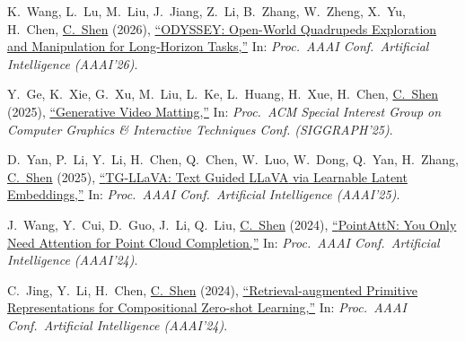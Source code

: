 \documentclass[9pt, a4paper]{article}
\newcommand{\years}[1]{\marginnote{\scriptsize #1}}
\def\highlight{\uline}
\begin{document}
\years{2026} \noindent K.~Wang, L.~Lu, M.~Liu, J.~Jiang, Z.~Li, B.~Zhang, W.~Zheng, X.~Yu, H.~Chen, \highlight{C.~Shen} (2026),
\href{http://www.google.com/search?lr=&ie=UTF-8&oe=UTF-8&q=ODYSSEY%3A+Open-World+Quadrupeds+Exploration+and+Manipulation+for+Long-Horizon+Tasks+Kaijun+Wang%2C+Liqin+Lu%2C+Mingyu+Liu%2C+Jianuo+Jiang%2C+Zeju+Li%2C+Bolin+Zhang%2C+Wancai+Zheng%2C+Xinyi+Yu%2C+Hao+Chen%2C+Chunhua+Shen}{``{ODYSSEY}: Open-World Quadrupeds Exploration and Manipulation for Long-Horizon Tasks,{}''}
In: \emph{Proc.\ AAAI Conf.\  Artificial Intelligence (AAAI'26)}.

\medskip

\years{2025} Y.~Ge, K.~Xie, G.~Xu, M.~Liu, L.~Ke, L.~Huang, H.~Xue, H.~Chen, \highlight{C.~Shen} (2025),
\href{http://www.google.com/search?lr=&ie=UTF-8&oe=UTF-8&q=Generative+Video+Matting+Yongtao+Ge%2C+Kangyang+Xie%2C+Guangkai+Xu%2C+Mingyu+Liu%2C+Li+Ke%2C+Longtao+Huang%2C+Hui+Xue%2C+Hao+Chen%2C+Chunhua+Shen}{``Generative Video Matting,{}''}
In: \emph{Proc.\ ACM Special Interest Group on Computer Graphics \& Interactive Techniques Conf. (SIGGRAPH'25)}.

\medskip

\years{2025} D.~Yan, P.~Li, Y.~Li, H.~Chen, Q.~Chen, W.~Luo, W.~Dong, Q.~Yan, H.~Zhang, \highlight{C.~Shen} (2025),
\href{http://www.google.com/search?lr=&ie=UTF-8&oe=UTF-8&q=TG-LLaVA%3A+Text+Guided+LLaVA+via+Learnable+Latent+Embeddings+Dawei+Yan%2C+Pengcheng+Li%2C+Yang+Li%2C+Hao+Chen%2C+Qingguo+Chen%2C+Weihua+Luo%2C+Wei+Dong%2C+Qingsen+Yan%2C+Haokui+Zhang%2C+Chunhua+Shen}{``{TG-LLaVA}: Text Guided {LLaVA} via Learnable Latent Embeddings,{}''}
In: \emph{Proc.\ AAAI Conf.\  Artificial Intelligence (AAAI'25)}.

\medskip

\years{2024} J.~Wang, Y.~Cui, D.~Guo, J.~Li, Q.~Liu, \highlight{C.~Shen} (2024),
\href{http://www.google.com/search?lr=&ie=UTF-8&oe=UTF-8&q=PointAttN%3A+You+Only+Need+Attention+for+Point+Cloud+Completion+Jun+Wang%2C+Ying+Cui%2C+Dongyan+Guo%2C+Junxia+Li%2C+Qingshan+Liu%2C+Chunhua+Shen}{``{PointAttN}: You Only Need Attention for Point Cloud Completion,{}''}
In: \emph{Proc.\ AAAI Conf.\  Artificial Intelligence (AAAI'24)}.

\medskip

\years{2024} C.~Jing, Y.~Li, H.~Chen, \highlight{C.~Shen} (2024),
\href{http://www.google.com/search?lr=&ie=UTF-8&oe=UTF-8&q=Retrieval-augmented+Primitive+Representations+for+Compositional+Zero-shot+Learning+Chenchen+Jing%2C+Yukun+Li%2C+Hao+Chen%2C+Chunhua+Shen}{``Retrieval-augmented Primitive Representations for Compositional Zero-shot Learning,{}''}
In: \emph{Proc.\ AAAI Conf.\  Artificial Intelligence (AAAI'24)}.
\end{document}
